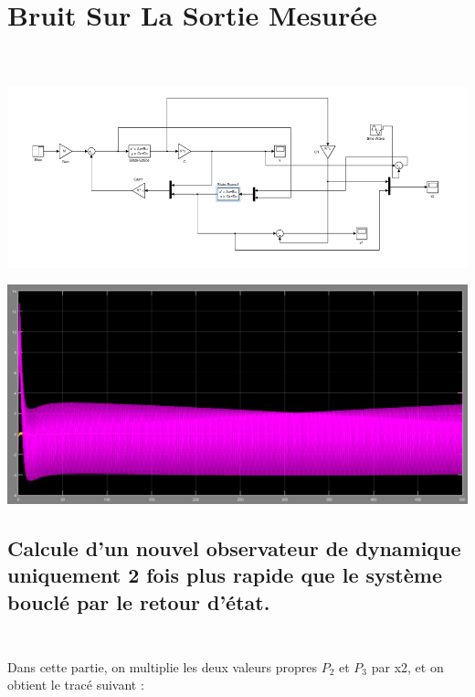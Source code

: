   
 \section{Bruit Sur La Sortie Mesurée\\\\}
 
 \begin{center}
\includegraphics[scale=0.6]{schemabloc_bruit.PNG}
\label{fig3} 
\end{center}


\begin{center}
\includegraphics[scale=0.4]{Y1_bruit.PNG}
\label{fig3} 
\end{center}
 
 

  \subsection{Calcule d'un nouvel observateur de dynamique uniquement 2 fois plus rapide que le système bouclé par le retour d’état.\\\\}

Dans cette partie, on multiplie les deux valeurs propres $P_{2}$ et $P_{3}$ par x2, et on obtient le tracé suivant :   


